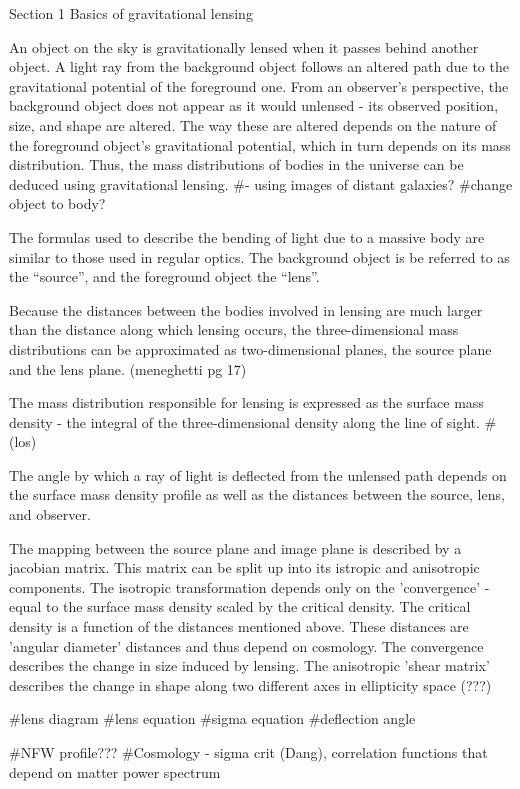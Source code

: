 Section 1
Basics of gravitational lensing

An object on the sky is gravitationally lensed when it passes behind another object.
A light ray from the background object follows an altered path due to the gravitational potential of the foreground one.
From an observer's perspective, the background object does not appear as it would unlensed - its observed position, size, and shape are altered.
The way these are altered depends on the nature of the foreground object's gravitational potential, which in turn depends on its mass distribution.
Thus, the mass distributions of bodies in the universe can be deduced using gravitational lensing. #- using images of distant galaxies?
#change object to body?

The formulas used to describe the bending of light due to a massive body are similar to those used in regular optics.
The background object is be referred to as the ``source'', and the foreground object the ``lens''.

Because the distances between the bodies involved in lensing are much larger than the distance along which lensing occurs, the three-dimensional mass distributions can be approximated as two-dimensional planes, the source plane and the lens plane. (meneghetti pg 17)

The mass distribution responsible for lensing is expressed as the surface mass density - the integral of the three-dimensional density along the line of sight. #(los)

The angle by which a ray of light is deflected from the unlensed path
depends on the surface mass density profile as well as the distances
between the source, lens, and observer. 

The mapping between the source plane and image plane is described by a
jacobian matrix. This matrix can be split up into its istropic and
anisotropic components. The isotropic transformation depends only on
the 'convergence' - equal to the surface mass density scaled by the
critical density. The critical density is a function of the distances
mentioned above. These distances are 'angular diameter' distances and
thus depend on cosmology. The convergence describes the change in size
induced by lensing. The anisotropic 'shear matrix' describes the
change in shape along two different axes in ellipticity space (???)

#lens diagram
#lens equation
#sigma equation
#deflection angle



#NFW profile???
#Cosmology - sigma crit (Dang), correlation functions that depend on matter power spectrum


